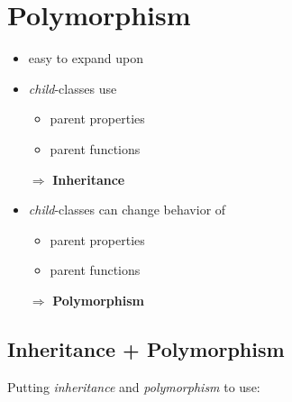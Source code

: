 \section*{Polymorphism}
\begin{frame}
\begin{itemize}
\setlength\itemsep{1em}
\item easy to expand upon
\item \emph{child}-classes use
\begin{itemize}
\item parent properties
\item parent functions
\end{itemize}
$\Rightarrow$ \textbf{Inheritance}
\item \emph{child}-classes can change behavior of
\begin{itemize}
\item parent properties
\item parent functions
\end{itemize}
$\Rightarrow$ \textbf{Polymorphism}
\end{itemize}
\end{frame}
\begin{frame}
\section*{Inheritance + Polymorphism}
Putting \emph{inheritance} and \emph{polymorphism} to use:
\begin{center}
\end{center}
\end{frame}

